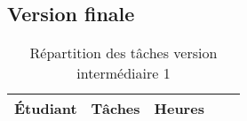 		\subsection{Version finale}
		\begin{table}[h]
			\centering
			\begin{tabular}{|c|r|l|c|r|}
				\hline
				\textbf{Étudiant} & \textbf{Tâches} & \textbf{Heures} \\
				\hline

			\end{tabular}
			\caption{Répartition des tâches version intermédiaire 1}
			\label{table:repartition3}
		\end{table}	
